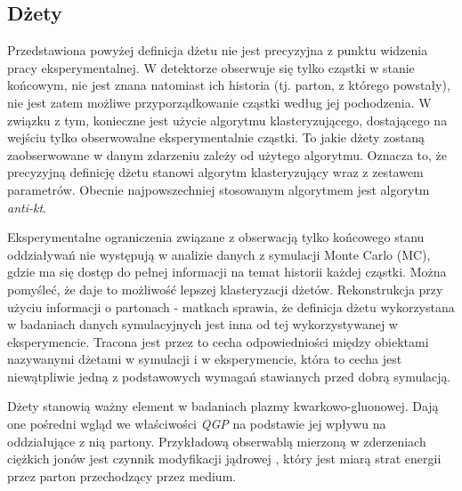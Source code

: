 \subsection{Dżety}
\label{subsec:dzet-def}

Przedstawiona powyżej definicja dżetu nie jest precyzyjna z punktu widzenia pracy eksperymentalnej. W detektorze obserwuje się tylko cząstki w stanie końcowym, nie jest znana natomiast ich historia (tj. parton, z którego powstały), nie jest zatem możliwe przyporządkowanie cząstki według jej pochodzenia. W związku z tym, konieczne jest użycie algorytmu klasteryzującego, dostającego na wejściu tylko obserwowalne eksperymentalnie cząstki. 
To jakie dżety zostaną zaobserwowane w danym zdarzeniu zależy od użytego algorytmu. Oznacza to, że precyzyjną definicję dżetu stanowi algorytm klasteryzujący wraz z zestawem parametrów. Obecnie najpowszechniej stosowanym algorytmem jest algorytm \textit{anti-kt}.





Eksperymentalne ograniczenia związane z obserwacją tylko końcowego stanu oddziaływań nie występują w analizie danych z symulacji Monte Carlo (MC), gdzie  ma się dostęp do pełnej informacji na temat historii każdej cząstki. 
Można pomyśleć, że daje to możliwość lepszej klasteryzacji dżetów. 
Rekonstrukcja przy użyciu informacji o partonach - matkach sprawia, że definicja dżetu wykorzystana w badaniach danych symulacyjnych jest inna od tej wykorzystywanej w eksperymencie. Tracona jest przez to cecha odpowiedniości między obiektami nazywanymi dżetami w symulacji  i w eksperymencie, która to cecha jest niewątpliwie jedną z podstawowych wymagań stawianych przed dobrą symulacją.

Dżety stanowią ważny element w badaniach plazmy kwarkowo-gluonowej.
Dają one pośredni wgląd we właściwości \textit{QGP} na podstawie jej wpływu na oddziałujące z nią partony. Przykładową obserwablą mierzoną w zderzeniach ciężkich jonów jest czynnik modyfikacji jądrowej , który jest miarą strat energii przez parton przechodzący przez medium.

